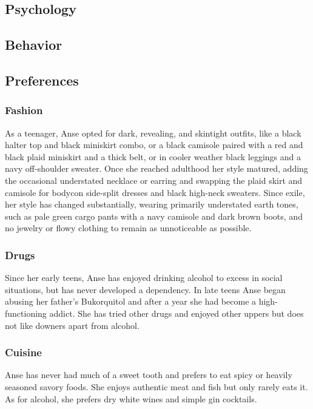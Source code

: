 \documentclass[12pt,a4paper,twocolumn]{article}
\begin{document}
	
	
	
	\begin{strip}
		\section{Psychology}
	\end{strip}
	
	\subsection{Behavior}
	
	
	\subsection{Preferences}
	\subsubsection{Fashion}
	As a teenager, Anse opted for dark, revealing, and skintight outfits, like a black halter top and black miniskirt combo, or a black camisole paired with a red and black plaid miniskirt and a thick belt, or in cooler weather black leggings and a navy off-shoulder sweater. Once she reached adulthood her style matured, adding the occasional understated necklace or earring and swapping the plaid skirt and camisole for bodycon side-split dresses and black high-neck sweaters. Since exile, her style has changed substantially, wearing primarily understated earth tones, such as pale green cargo pants with a navy camisole and dark brown boots, and no jewelry or flowy clothing to remain as unnoticeable as possible.
	\subsubsection{Drugs}
\indent Since her early teens, Anse has enjoyed drinking alcohol to excess in social situations, but has never developed a dependency. In late teens Anse began abusing her father's Bukorquitol and after a year she had become a high-functioning addict. She has tried other drugs and enjoyed other uppers but does not like downers apart from alcohol.
\subsubsection{Cuisine}
\indent Anse has never had much of a sweet tooth and prefers to eat spicy or heavily seasoned savory foods. She enjoys authentic meat and fish but only rarely eats it.\\
\indent 	As for alcohol, she prefers dry white wines and simple gin cocktails.
\end{document}
